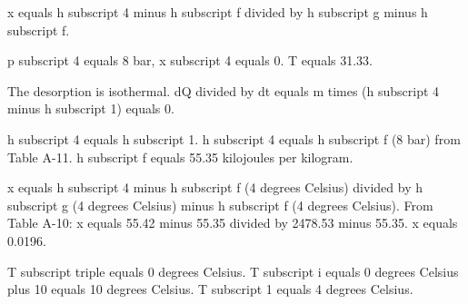 x equals h subscript 4 minus h subscript f divided by h subscript g minus h subscript f.  

p subscript 4 equals 8 bar, x subscript 4 equals 0.  
T equals 31.33.  

The desorption is isothermal.  
dQ divided by dt equals m times (h subscript 4 minus h subscript 1) equals 0.  

h subscript 4 equals h subscript 1.  
h subscript 4 equals h subscript f (8 bar) from Table A-11.  
h subscript f equals 55.35 kilojoules per kilogram.  

x equals h subscript 4 minus h subscript f (4 degrees Celsius) divided by h subscript g (4 degrees Celsius) minus h subscript f (4 degrees Celsius).  
From Table A-10:  
x equals 55.42 minus 55.35 divided by 2478.53 minus 55.35.  
x equals 0.0196.  

T subscript triple equals 0 degrees Celsius.  
T subscript i equals 0 degrees Celsius plus 10 equals 10 degrees Celsius.  
T subscript 1 equals 4 degrees Celsius.